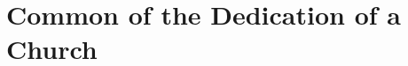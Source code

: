 {
\section{Common of the Dedication of a Church}
\label{commondedicationofchurch}
\subtitle{I \& II Vespers}
\medskip

\def\prepsalmtitleone{\needspace{8\baselineskip}}
\def\postpsalmtitletwo{\needspace{8\baselineskip}}
\def\prepsalmtwoverses{\vspace{-0.05\baselineskip}}
\def\prerepeatantiphontwo{}
\def\postpsalmtitlethree{\medskip\needspace{10\baselineskip}}
\def\prepsalmthreeverses{\medskip}
\def\prepsalmfiveverses{\smallskip}
\def\prevr{\needspace{10\baselineskip}}
\def\definevesperspropers{
  \def\premagverses{\oldneedspace{15\baselineskip}}
}
\def\definevesperspropersalt{
}
\def\vesperspropersnote{At II Vespers:}
\def\vesperspropersaltnote{At I Vespers:}
\def\prehymntranslation{\vspace{-0.5\baselineskip}}

\bigskip
{}
}